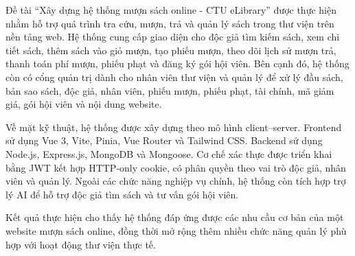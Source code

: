 \documentclass[../main.tex]{subfiles}
\begin{document}
Đề tài ``Xây dựng hệ thống mượn sách online - CTU eLibrary'' được thực hiện nhằm hỗ trợ quá trình tra cứu, mượn, trả và quản lý sách trong thư viện trên nền tảng web. Hệ thống cung cấp giao diện cho độc giả tìm kiếm sách, xem chi tiết sách, thêm sách vào giỏ mượn, tạo phiếu mượn, theo dõi lịch sử mượn trả, thanh toán phí mượn, phiếu phạt và đăng ký gói hội viên. Bên cạnh đó, hệ thống còn có cổng quản trị dành cho nhân viên thư viện và quản lý để xử lý đầu sách, bản sao sách, độc giả, nhân viên, phiếu mượn, phiếu phạt, tài chính, mã giảm giá, gói hội viên và nội dung website.

Về mặt kỹ thuật, hệ thống được xây dựng theo mô hình client--server. Frontend sử dụng Vue 3, Vite, Pinia, Vue Router và Tailwind CSS. Backend sử dụng Node.js, Express.js, MongoDB và Mongoose. Cơ chế xác thực được triển khai bằng JWT kết hợp HTTP-only cookie, có phân quyền theo vai trò độc giả, nhân viên và quản lý. Ngoài các chức năng nghiệp vụ chính, hệ thống còn tích hợp trợ lý AI để hỗ trợ độc giả tìm sách và tư vấn gói hội viên.

Kết quả thực hiện cho thấy hệ thống đáp ứng được các nhu cầu cơ bản của một website mượn sách online, đồng thời mở rộng thêm nhiều chức năng quản lý phù hợp với hoạt động thư viện thực tế.
\end{document}
